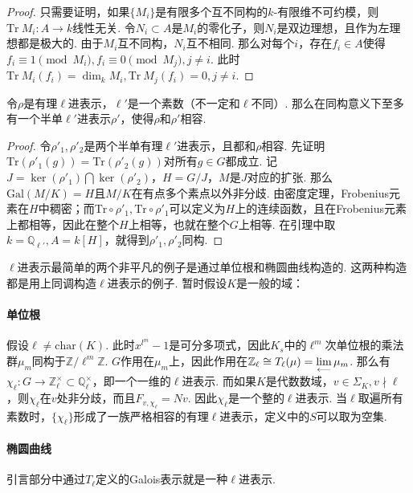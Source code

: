 \begin{proof}
    只需要证明，如果$\{M_i\}$是有限多个互不同构的$k$-有限维不可约模，则$\mathrm{Tr}\ M_i: A\to k$线性无关. 令$N_i\subset A$是$M_i$的零化子，则$N_i$是双边理想，且作为左理想都是极大的. 由于$M_i$互不同构，$N_i$互不相同. 那么对每个$i$，存在$f_i\in A$使得$f_i\equiv 1\pmod{M_i}, f_i\equiv 0\pmod{M_j}, j\neq i$. 此时$\mathrm{Tr}\ M_i(f_i) = \dim_k M_i, \mathrm{Tr}\ M_j(f_i) = 0, j\neq i$.
\end{proof}

\begin{cthm}
    令$\rho$是有理$\ell$进表示，$\ell'$是一个素数（不一定和$\ell$不同）. 那么在同构意义下至多有一个半单$\ell'$进表示$\rho'$，使得$\rho$和$\rho'$相容.
\end{cthm}

\begin{proof}
    令$\rho'_1, \rho'_2$是两个半单有理$\ell'$进表示，且都和$\rho$相容. 先证明$\mathrm{Tr}(\rho'_1(g)) = \mathrm{Tr}(\rho'_2(g))$对所有$g\in G$都成立. 记$J = \ker(\rho'_1)\bigcap \ker(\rho'_2)$，$H = G/J$，$M$是$J$对应的扩张. 那么$\mathrm{Gal}(M/K) = H$且$M/K$在有点多个素点以外非分歧. 由\Chebotarev 密度定理，Frobenius元素在$H$中稠密；而$\mathrm{Tr}\circ \rho'_1, \mathrm{Tr}\circ \rho'_1$可以定义为$H$上的连续函数，且在Frobenius元素上都相等，因此在整个$H$上相等，也就在整个$G$上相等. 在引理中取$k = \mathbb{Q}_{\ell'}, A = k[H]$，就得到$\rho'_1, \rho'_2$同构.
\end{proof}

$\ell$进表示最简单的两个非平凡的例子是通过单位根和椭圆曲线构造的. 这两种构造都是用上同调构造$\ell$进表示的例子. 暂时假设$K$是一般的域：
\paragraph{单位根}
假设$\ell\neq \mathrm{char}(K)$. 此时$x^{l^m}-1$是可分多项式，因此$K_s$中的$\ell^m$次单位根的乘法群$\mu_m$同构于$\mathbb{Z}/\ell^m \mathbb{Z}$. $G$作用在$\mu_m$上，因此作用在$\mathbb{Z}_{\ell} \cong T_{\ell}(\mu) = \lim\limits_{\longleftarrow}\mu_m$. 那么有$\chi_{\ell}:G\to \mathbb{Z}_{\ell}^{\times}\subset \mathbb{Q}_{\ell}^{\times}$，即一个一维的$\ell$进表示. 而如果$K$是代数数域，$v\in \Sigma_K, v\nmid \ell$，则$\chi_{\ell}$在$v$处非分歧，而且$F_{v, \chi_{\ell}} = Nv$. 因此$\chi_{\ell}$是一个整的$\ell$进表示. 当$\ell$取遍所有素数时，$\{\chi_{\ell}\}$形成了一族严格相容的有理$\ell$进表示，定义中的$S$可以取为空集.

\paragraph{椭圆曲线}
引言部分中通过$T_{\ell}$定义的Galois表示就是一种$\ell$进表示.


